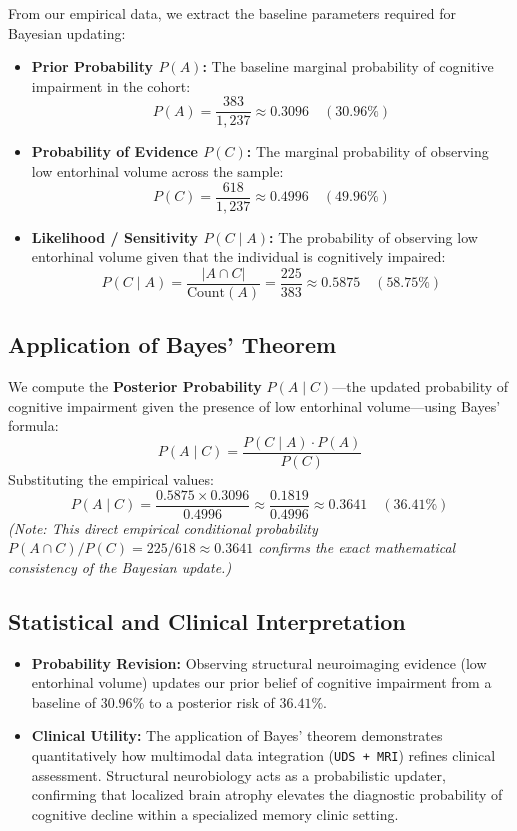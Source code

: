 \documentclass[11pt, a4paper]{article}
\begin{document}
From our empirical data, we extract the baseline parameters required for Bayesian updating:
\begin{itemize}
    \item \textbf{Prior Probability $P(A)$:} The baseline marginal probability of cognitive impairment in the cohort:
    \[
    P(A) = \frac{383}{1,237} \approx 0.3096 \quad (30.96\%)
    \]
    \item \textbf{Probability of Evidence $P(C)$:} The marginal probability of observing low entorhinal volume across the sample:
    \[
    P(C) = \frac{618}{1,237} \approx 0.4996 \quad (49.96\%)
    \]
    \item \textbf{Likelihood / Sensitivity $P(C \mid A)$:} The probability of observing low entorhinal volume given that the individual is cognitively impaired:
    \[
    P(C \mid A) = \frac{|A \cap C|}{\text{Count}(A)} = \frac{225}{383} \approx 0.5875 \quad (58.75\%)
    \]
\end{itemize}

\subsection{Application of Bayes' Theorem}
We compute the \textbf{Posterior Probability} $P(A \mid C)$---the updated probability of cognitive impairment given the presence of low entorhinal volume---using Bayes' formula:
\[
P(A \mid C) = \frac{P(C \mid A) \cdot P(A)}{P(C)}
\]
Substituting the empirical values:
\[
P(A \mid C) = \frac{0.5875 \times 0.3096}{0.4996} \approx \frac{0.1819}{0.4996} \approx 0.3641 \quad (36.41\%)
\]
\textit{(Note: This direct empirical conditional probability $P(A \cap C) / P(C) = 225 / 618 \approx 0.3641$ confirms the exact mathematical consistency of the Bayesian update.)}

\subsection{Statistical and Clinical Interpretation}
\begin{itemize}
    \item \textbf{Probability Revision:} Observing structural neuroimaging evidence (low entorhinal volume) updates our prior belief of cognitive impairment from a baseline of \textbf{$30.96\%$} to a posterior risk of \textbf{$36.41\%$}.
    \item \textbf{Clinical Utility:} The application of Bayes' theorem demonstrates quantitatively how multimodal data integration (\texttt{UDS + MRI}) refines clinical assessment. Structural neurobiology acts as a probabilistic updater, confirming that localized brain atrophy elevates the diagnostic probability of cognitive decline within a specialized memory clinic setting.
\end{itemize}
\end{document}
